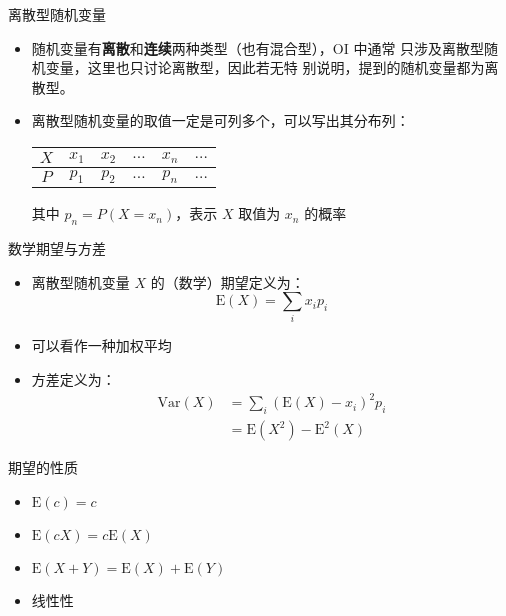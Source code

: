 \documentclass{beamer}
\newcommand{\E}{\text{E}}
\newcommand{\var}{\text{Var}}
\begin{document}
    \begin{frame}{离散型随机变量}
        \begin{itemize}
            \setlength{\itemsep}{10pt}
            \item 随机变量有\textbf{离散}和\textbf{连续}两种类型（也有混合型），OI 中通常
            只涉及离散型随机变量，这里也只讨论离散型，因此若无特
            别说明，提到的随机变量都为离散型。
            \item 离散型随机变量的取值一定是可列多个，可以写出其分布列：
            \begin{table}
                \begin{tabular}{cccccc}
                    \toprule
                    $X$ & $x_1$ & $x_2$ & $\dots$ & $x_n$ & $\dots$ \\
                    \midrule
                    $P$ & $p_1$ & $p_2$ & $\dots$ & $p_n$ & $\dots$ \\
                    \bottomrule
                \end{tabular}
            \end{table}
            其中 $p_n=P(X=x_n)$，表示 $X$ 取值为 $x_n$ 的概率
        \end{itemize}
    \end{frame}

    \begin{frame}{数学期望与方差}
        \begin{itemize}
            \item 离散型随机变量 $X$ 的（数学）期望定义为：
            $$
                \E(X) = \sum_{i} x_i p_i
            $$
            \item 可以看作一种加权平均
            \item 方差定义为：
            \begin{align*}
                \var(X)
                &= \sum_{i}\left(\E(X)-x_i\right)^2p_i \\
                &= \E\left(X^2\right)-\E^2(X)
            \end{align*}
        \end{itemize}
    \end{frame}

    \begin{frame}{期望的性质}
        \begin{itemize}
            \setlength{\itemsep}{10pt}
            \item $\E(c)=c$
            \item $\E(cX)=c\E(X)$
            \item $\E(X+Y)=\E(X)+\E(Y)$
            \item 线性性
        \end{itemize}
    \end{frame}
\end{document}
